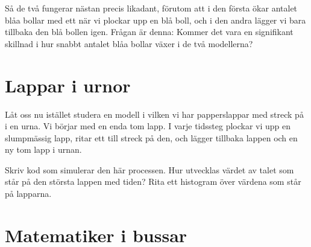 \documentclass[nobib]{tufte-handout}
\begin{document}
\begin{xca}
\begin{enumerate}
        Så de två fungerar nästan precis likadant, förutom att i den första ökar antalet blåa bollar med ett när vi plockar upp en blå boll, och i den andra lägger vi bara tillbaka den blå bollen igen. Frågan är denna: Kommer det vara en signifikant skillnad i hur snabbt antalet blåa bollar växer i de två modellerna?
    \end{enumerate}
\end{xca}

\section{Lappar i urnor}

Låt oss nu istället studera en modell i vilken vi har papperslappar med streck på i en urna. Vi börjar med en enda tom lapp. I varje tidssteg plockar vi upp en slumpmässig lapp, ritar ett till streck på den, och lägger tillbaka lappen och en ny tom lapp i urnan.

\begin{xca}
    Skriv kod som simulerar den här processen. Hur utvecklas värdet av talet som står på den största lappen med tiden? Rita ett histogram över värdena som står på lapparna.
\end{xca}

\section{Matematiker i bussar}


%
%
\end{document}
